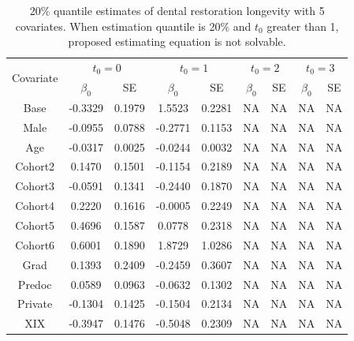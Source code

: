 \documentclass[titlepage,english,12pt]{article}
\begin{document}
	\begin{table}[H] \label{table:12}
		\caption{20\% quantile estimates of dental restoration longevity with 5 covariates. When estimation quantile is 20\% and $t_0$ greater than 1, proposed estimating equation is not solvable.}
		\centering
		\begin{tabular}{|c|c|c|c|c|c|c|c|c|}
			\hline
			\multirow{2}{*}{Covariate} & \multicolumn{2}{c|}{$t_0=0$} & \multicolumn{2}{c|}{$t_0=1$} & \multicolumn{2}{c|}{$t_0=2$} & \multicolumn{2}{c|}{$t_0=3$}\\ 
			\cline{2-9}
			& $\beta_0$ & SE & $\beta_0$ & SE & $\beta_0$ & SE & $\beta_0$ & SE\\
			\hline\hline
			Base & -0.3329 & 0.1979 & 1.5523 & 0.2281 & NA & NA & NA & NA \\ 
			Male & -0.0955 & 0.0788 & -0.2771 & 0.1153 & NA & NA & NA & NA \\ 
			Age & -0.0317 & 0.0025 & -0.0244 & 0.0032 & NA & NA & NA & NA \\ 
			Cohort2 & 0.1470 & 0.1501 & -0.1154 & 0.2189 & NA & NA & NA & NA \\ 
			Cohort3 & -0.0591 & 0.1341 & -0.2440 & 0.1870 & NA & NA & NA & NA \\ 
			Cohort4 & 0.2220 & 0.1616 & -0.0005 & 0.2249 & NA & NA & NA & NA \\ 
			Cohort5 & 0.4696 & 0.1587 & 0.0778 & 0.2318 & NA & NA & NA & NA \\ 
			Cohort6 & 0.6001 & 0.1890 & 1.8729 & 1.0286 & NA & NA & NA & NA \\ 
			Grad & 0.1393 & 0.2409 & -0.2459 & 0.3607 & NA & NA & NA & NA \\ 
			Predoc & 0.0589 & 0.0963 & -0.0632 & 0.1302 & NA & NA & NA & NA \\ 
			Private & -0.1304 & 0.1425 & -0.1504 & 0.2134 & NA & NA & NA & NA \\ 
			XIX & -0.3947 & 0.1476 & -0.5048 & 0.2309 & NA & NA & NA & NA \\
			\hline
		\end{tabular}
	\end{table}
\end{document}
